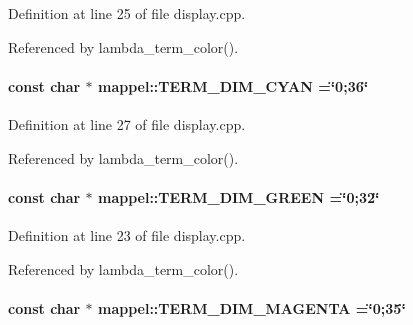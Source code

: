 Definition at line 25 of file display.\+cpp.



Referenced by lambda\+\_\+term\+\_\+color().

\paragraph[{\texorpdfstring{T\+E\+R\+M\+\_\+\+D\+I\+M\+\_\+\+C\+Y\+AN}{TERM_DIM_CYAN}}]{\setlength{\rightskip}{0pt plus 5cm}const char $\ast$ mappel\+::\+T\+E\+R\+M\+\_\+\+D\+I\+M\+\_\+\+C\+Y\+AN =\char`\"{}0;36\char`\"{}}\hypertarget{namespacemappel_ad168ab0229814251071c6680e9792b0f}{}\label{namespacemappel_ad168ab0229814251071c6680e9792b0f}


Definition at line 27 of file display.\+cpp.



Referenced by lambda\+\_\+term\+\_\+color().

\paragraph[{\texorpdfstring{T\+E\+R\+M\+\_\+\+D\+I\+M\+\_\+\+G\+R\+E\+EN}{TERM_DIM_GREEN}}]{\setlength{\rightskip}{0pt plus 5cm}const char $\ast$ mappel\+::\+T\+E\+R\+M\+\_\+\+D\+I\+M\+\_\+\+G\+R\+E\+EN =\char`\"{}0;32\char`\"{}}\hypertarget{namespacemappel_af35fa592f92c75d4190e1b5aff9fbcfe}{}\label{namespacemappel_af35fa592f92c75d4190e1b5aff9fbcfe}


Definition at line 23 of file display.\+cpp.



Referenced by lambda\+\_\+term\+\_\+color().

\paragraph[{\texorpdfstring{T\+E\+R\+M\+\_\+\+D\+I\+M\+\_\+\+M\+A\+G\+E\+N\+TA}{TERM_DIM_MAGENTA}}]{\setlength{\rightskip}{0pt plus 5cm}const char $\ast$ mappel\+::\+T\+E\+R\+M\+\_\+\+D\+I\+M\+\_\+\+M\+A\+G\+E\+N\+TA =\char`\"{}0;35\char`\"{}}\hypertarget{namespacemappel_add36264e8025d4db88e03897ecda89b5}{}\label{namespacemappel_add36264e8025d4db88e03897ecda89b5}


